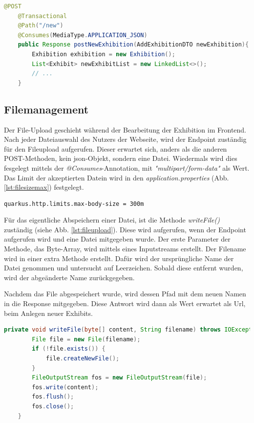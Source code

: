 \begin{lstlisting}[label=lst:newExhibitionMethod, language=Java, caption=Methode zum Anlegen von Exhibitions]
    @POST
    @Transactional
    @Path("/new")
    @Consumes(MediaType.APPLICATION_JSON)
    public Response postNewExhibition(AddExhibitionDTO newExhibition){
        Exhibition exhibition = new Exhibition();
        List<Exhibit> newExhibitList = new LinkedList<>();
        // ...
    }
\end{lstlisting}

\subsection{Filemanagement}
Der File-Upload geschieht während der Bearbeitung der Exhibition im Frontend. 
Nach jeder Dateiauswahl des Nutzers der Webseite, wird der Endpoint zuständig für den Fileupload aufgerufen. 
Dieser erwartet sich, anders als die anderen POST-Methoden, kein \gls{json}-Objekt, sondern eine Datei. 
Wiedermals wird dies fesgelegt mittels der \emph{@Consumes}-Annotation, mit \emph{"multipart/form-data"} als Wert. 
Das Limit der akzeptierten Datein wird in den \emph{application.properties} (Abb. \ref{lst:filesizemax}) festgelegt. 
\begin{lstlisting}[label=lst:filesizemax]
    quarkus.http.limits.max-body-size = 300m
\end{lstlisting}

Für das eigentliche Abspeichern einer Datei, ist die Methode \emph{writeFile()} zuständig (siehe Abb. \ref{lst:fileupload}). 
Diese wird aufgerufen, wenn der Endpoint aufgerufen wird und eine Datei mitgegeben wurde. 
Der erste Parameter der Methode, das Byte-Array, wird mittels eines Inputstreams erstellt. 
Der Filename wird in einer extra Methode erstellt. 
Dafür wird der ursprüngliche Name der Datei genommen und untersucht auf Leerzeichen. 
Sobald diese entfernt wurden, wird der abgeänderte Name zurückgegeben. 

Nachdem das File abgespeichert wurde, wird dessen Pfad mit dem neuen Namen in die Response mitgegeben. 
Diese Antwort wird dann als Wert erwartet als Url, beim Anlegen neuer Exhibits. 


\begin{lstlisting}[label=lst:fileupload, language=Java, caption=Hochladen der Dateien]
    private void writeFile(byte[] content, String filename) throws IOException {
        File file = new File(filename);
        if (!file.exists()) {
            file.createNewFile();
        }
        FileOutputStream fos = new FileOutputStream(file);
        fos.write(content);
        fos.flush();
        fos.close();
    }
\end{lstlisting}



